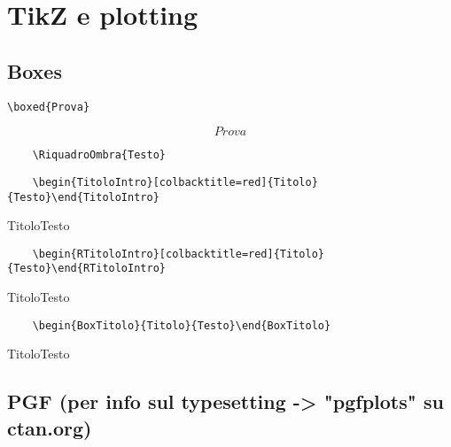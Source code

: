 \chapter{TikZ e plotting}
\section{Boxes}
\begin{verbatim}
\boxed{Prova}
\end{verbatim}
$$\boxed{Prova}$$

\begin{verbatim}
	\RiquadroOmbra{Testo}
\end{verbatim}

\begin{verbatim}
	\begin{TitoloIntro}[colbacktitle=red]{Titolo}{Testo}\end{TitoloIntro}
\end{verbatim}
\begin{TitoloIntro}[colbacktitle=red, width=\textwidth]{Titolo}{Testo}\end{TitoloIntro}

\begin{verbatim}
	\begin{RTitoloIntro}[colbacktitle=red]{Titolo}{Testo}\end{RTitoloIntro}
\end{verbatim}
\begin{RTitoloIntro}[colbacktitle=red]{Titolo}{Testo}\end{RTitoloIntro}

\begin{verbatim}
	\begin{BoxTitolo}{Titolo}{Testo}\end{BoxTitolo}
\end{verbatim}
\begin{BoxTitolo}{Titolo}{Testo}\end{BoxTitolo}

\newpage
\section{PGF (per info sul typesetting -> "pgfplots" su ctan.org)}

\begin{center}
\end{center}
\vspace{2cm}

